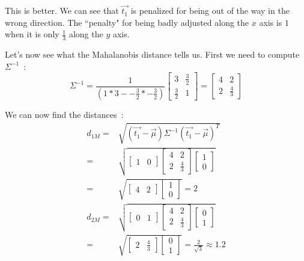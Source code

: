 \documentclass[11pt,twocolumn]{amsart} %
\begin{document}
This is better. We can see that $\vec{t_1}$ is penalized for being out of the way in the wrong direction. The ``penalty" for being badly adjusted along the $x$ axis is $1$ when it is only $\frac{1}{3}$ along the $y$ axis.

Let's now see what the Mahalanobis distance tells us. First we need to compute $\Sigma^{-1}$~:
\begin{equation*}
  \Sigma^{-1} = \frac{1}{(1*3 - -\frac{3}{2}*-\frac{3}{2})} \begin{bmatrix} 3 & \frac{3}{2} \\ \frac{3}{2} & 1\end{bmatrix} = \begin{bmatrix} 4 & 2 \\ 2 & \frac{4}{3} \end{bmatrix}
\end{equation*}

We can now find the distances~:
\begin{align*}
  d_{1M} = & \sqrt{(\vec{t_1} - \vec{\mu})\Sigma^{-1}(\vec{t_1} - \vec{\mu})^T} \\
         = & \sqrt{\begin{bmatrix} 1 & 0 \end{bmatrix} \begin{bmatrix} 4 & 2 \\ 2 & \frac{4}{3}\end{bmatrix} \begin{bmatrix} 1 \\ 0 \end{bmatrix}} \\
         = & \sqrt{\begin{bmatrix} 4 & 2 \end{bmatrix} \begin{bmatrix} 1 \\ 0 \end{bmatrix}} = 2\\
  d_{2M} = & \sqrt{\begin{bmatrix} 0 & 1 \end{bmatrix} \begin{bmatrix} 4 & 2 \\ 2 & \frac{4}{3}\end{bmatrix} \begin{bmatrix} 0 \\ 1 \end{bmatrix}} \\
         = & \sqrt{\begin{bmatrix} 2 & \frac{4}{3}\end{bmatrix} \begin{bmatrix} 0 \\ 1 \end{bmatrix}} = \frac{2}{\sqrt{3}} \approx 1.2\\
\end{align*}
\end{document}
